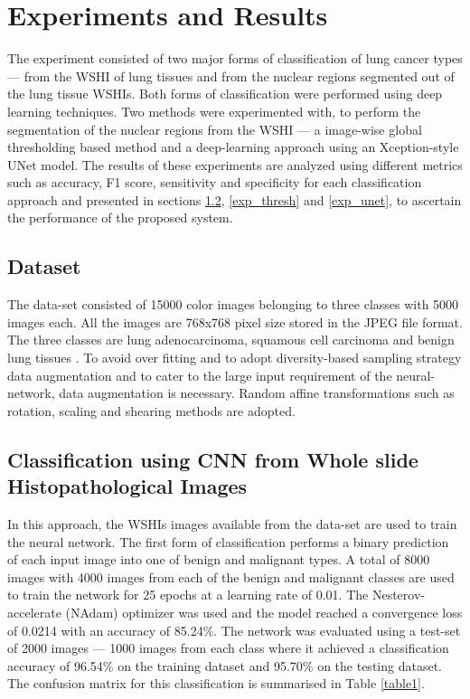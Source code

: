 \documentclass{comjnl}
\begin{document}
 \section{Experiments and Results}
\label{sec6_results}
The experiment consisted of two major forms of classification of lung cancer types --- from the WSHI of lung tissues and from the nuclear regions segmented out of the lung tissue WSHIs. Both forms of classification were performed using deep learning techniques. Two methods were experimented with, to perform the segmentation of the nuclear regions from the WSHI --- a image-wise global thresholding based method and a deep-learning approach using an Xception-style UNet model. The results of these experiments are analyzed using different metrics such as accuracy, F1 score, sensitivity and specificity for each classification approach and presented in sections \ref{exp_WSHI}, \ref{exp_thresh} and \ref{exp_unet}, to ascertain the performance of the proposed system.

\subsection{Dataset}
The data-set consisted of 15000 color images belonging to three classes with 5000 images each. All the images are 768x768 pixel size stored in the JPEG file format. The three classes are lung adenocarcinoma, squamous cell carcinoma and benign lung tissues \cite{conf-dataset}.  To avoid over fitting and to adopt diversity-based sampling strategy data augmentation and to cater to the large input requirement of the neural-network, data augmentation is necessary. Random affine transformations such as rotation, scaling and shearing methods are adopted.


\subsection{Classification using CNN from Whole slide Histopathological Images}
\label{exp_WSHI}

In this approach, the WSHIs images available from the data-set are used to train the neural network. The first form of classification performs a binary prediction of each input image into one of benign and malignant types. A total of 8000 images with 4000 images from each of the benign and malignant classes are used to train the network for 25 epochs at a learning rate of 0.01. The Nesterov-accelerate (NAdam) optimizer was used and the model reached a convergence loss of 0.0214 with an accuracy of 85.24\%. The network was evaluated using a test-set of 2000 images --- 1000 images from each class where it achieved a classification accuracy of 96.54\% on the training dataset and 95.70\% on the testing dataset. The confusion matrix for this classification is summarised in Table \ref{table1}.
\end{document}
